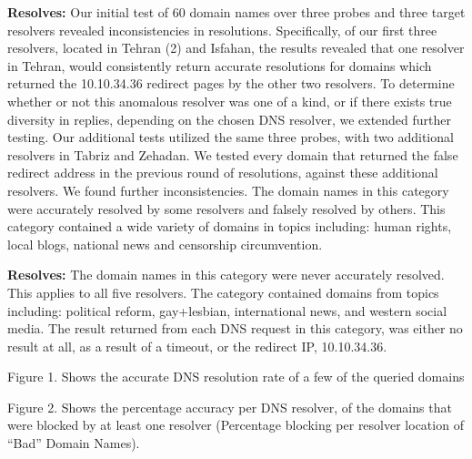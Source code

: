 \textbf{ Resolves:} Our initial test of 60 domain names over three probes and three target resolvers revealed inconsistencies in resolutions. Specifically, of our first three resolvers, located in Tehran (2) and Isfahan, the results revealed that one resolver in Tehran, would consistently return accurate resolutions for domains which returned the 10.10.34.36 redirect pages by the other two resolvers. To determine whether or not this anomalous resolver was one of a kind, or if there exists true diversity in replies, depending on the chosen DNS resolver, we extended further testing. Our additional tests utilized the same three probes, with two additional resolvers in Tabriz and Zehadan. We tested every domain that returned the false redirect address in the previous round of resolutions, against these additional resolvers. We found further inconsistencies. The domain names in this category were accurately resolved by some resolvers and falsely resolved by others. This category contained a wide variety of domains in topics including: human rights, local blogs, national news and censorship circumvention.

\textbf{ Resolves:} The domain names in this category were never accurately resolved. This applies to all five resolvers. The category contained domains from topics including: political reform, gay+lesbian, international news, and western social media. The result returned from each DNS request in this category, was either no result at all, as a result of a timeout, or the redirect IP, 10.10.34.36.

Figure 1. Shows the accurate DNS resolution rate of a few of the queried domains


Figure 2. Shows the percentage accuracy per DNS resolver, of the domains that were blocked by at least one resolver (Percentage blocking per resolver location of “Bad” Domain Names).